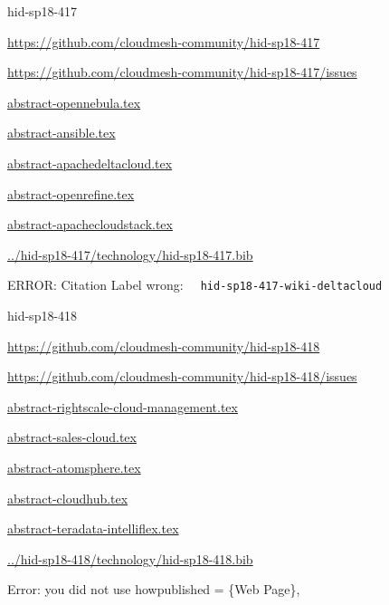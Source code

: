 \begin{IU}

hid-sp18-417

\url{https://github.com/cloudmesh-community/hid-sp18-417}

\url{https://github.com/cloudmesh-community/hid-sp18-417/issues}

\href{https://github.com/cloudmesh-community/hid-sp18-417/blob/master//technology/abstract-opennebula.tex}{abstract-opennebula.tex}

\href{https://github.com/cloudmesh-community/hid-sp18-417/blob/master//technology/abstract-ansible.tex}{abstract-ansible.tex}

\href{https://github.com/cloudmesh-community/hid-sp18-417/blob/master//technology/abstract-apachedeltacloud.tex}{abstract-apachedeltacloud.tex}

\href{https://github.com/cloudmesh-community/hid-sp18-417/blob/master//technology/abstract-openrefine.tex}{abstract-openrefine.tex}

\href{https://github.com/cloudmesh-community/hid-sp18-417/blob/master//technology/abstract-apachecloudstack.tex}{abstract-apachecloudstack.tex}

\href{https://github.com/cloudmesh-community/hid-sp18-417/blob/master//technology/hid-sp18-417.bib}{../hid-sp18-417/technology/hid-sp18-417.bib}

 ERROR: Citation Label wrong: \verb|  hid-sp18-417-wiki-deltacloud |

\end{IU}


\begin{IU}

hid-sp18-418

\url{https://github.com/cloudmesh-community/hid-sp18-418}

\url{https://github.com/cloudmesh-community/hid-sp18-418/issues}

\href{https://github.com/cloudmesh-community/hid-sp18-418/blob/master//technology/abstract-rightscale-cloud-management.tex}{abstract-rightscale-cloud-management.tex}

\href{https://github.com/cloudmesh-community/hid-sp18-418/blob/master//technology/abstract-sales-cloud.tex}{abstract-sales-cloud.tex}

\href{https://github.com/cloudmesh-community/hid-sp18-418/blob/master//technology/abstract-atomsphere.tex}{abstract-atomsphere.tex}

\href{https://github.com/cloudmesh-community/hid-sp18-418/blob/master//technology/abstract-cloudhub.tex}{abstract-cloudhub.tex}

\href{https://github.com/cloudmesh-community/hid-sp18-418/blob/master//technology/abstract-teradata-intelliflex.tex}{abstract-teradata-intelliflex.tex}

\href{https://github.com/cloudmesh-community/hid-sp18-418/blob/master//technology/hid-sp18-418.bib}{../hid-sp18-418/technology/hid-sp18-418.bib}

Error: you did not use howpublished = \{Web Page\},

\end{IU}


